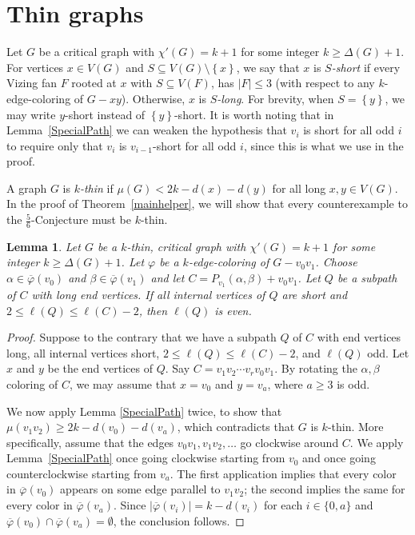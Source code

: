 \documentclass[12pt]{amsart}
\theoremstyle{plain}
\newtheorem{lem}[thm]{Lemma}
\theoremstyle{definition}
\theoremstyle{remark}
\newcommand{\set}[1]{\left\{ #1 \right\}}
\newcommand{\vph}{\varphi}
\newcommand{\vphn}{\overline{\varphi}}
\begin{document}
\section{Thin graphs}
\label{sec:thin}
Let $G$ be a critical graph with $\chi'(G) = k+1$ for some integer $k \ge \Delta(G) + 1$.
For vertices $x \in V(G)$ and $S \subseteq V(G) \setminus \set{x}$, we say that $x$ is \emph{$S$-short} if 
every Vizing fan $F$ rooted at $x$ with $S \subseteq V(F)$, has $|F| \le 3$ (with respect to any $k$-edge-coloring of $G-xy$).
Otherwise, $x$ is \emph{$S$-long}.  For brevity, when $S = \set{y}$, we may write $y$-short instead of $\set{y}$-short.
It is worth noting that in Lemma~\ref{SpecialPath} we can weaken the hypothesis
that $v_i$ is short for all odd $i$ to require only that $v_i$ is
$v_{i-1}$-short for all odd $i$, since this is what we use in the proof.  

A graph $G$ is \emph{$k$-thin} if $\mu(G) < 2k - d(x) - d(y)$ for all
long $x,y \in V(G)$.  In the proof of Theorem~\ref{mainhelper}, we will show that
every counterexample to the $\frac56$-Conjecture must be $k$-thin.

\begin{lem}\label{NonSpecialsInThinAreAtEvenDistance}
Let $G$ be a $k$-thin, critical graph with $\chi'(G) = k+1$ for some integer $k \ge \Delta(G) + 1$.
Let $\vph$ be a $k$-edge-coloring of $G-v_0v_1$. Choose $\alpha \in \vphn(v_0)$
and $\beta \in \vphn(v_1)$ and let $C = P_{v_1}(\alpha, \beta) + v_0v_1$.
Let $Q$ be a subpath of $C$ with long end vertices.  If all internal vertices
of $Q$ are short and $2 \le \ell(Q) \le \ell(C) - 2$, then $\ell(Q)$ is even.
\end{lem}
\begin{proof}
Suppose to the contrary that we have a subpath $Q$ of $C$ with end vertices
long, all internal vertices short, $2\le \ell(Q) \le \ell(C) - 2$,
and $\ell(Q)$ odd.  Let $x$ and $y$ be the end vertices of $Q$.
Say $C = v_1v_2\cdots v_rv_0v_1$.  By rotating the $\alpha,\beta$ coloring of
$C$, we may assume that $x = v_0$ and $y = v_a$, where $a \ge 3$ is odd.

We now apply Lemma \ref{SpecialPath} twice, to show that $\mu(v_1v_2) \ge 2k -
d(v_0) - d(v_a)$, which contradicts that $G$ is $k$-thin.  More specifically,
assume that the edges $v_0v_1,v_1v_2,\ldots$ go clockwise around $C$.  We apply
Lemma~\ref{SpecialPath} once going clockwise starting from $v_0$ and once going
counterclockwise starting from $v_a$.  The first application implies that every
color in $\vphn(v_0)$ appears on some edge parallel to $v_1v_2$; the second
implies the same for every color in $\vphn(v_a)$.  Since $|\vphn(v_i)|=k-d(v_i)$
for each $i\in\{0,a\}$ and $\vphn(v_0)\cap \vphn(v_a)=\emptyset$, the conclusion
follows.
\end{proof}
\end{document}
